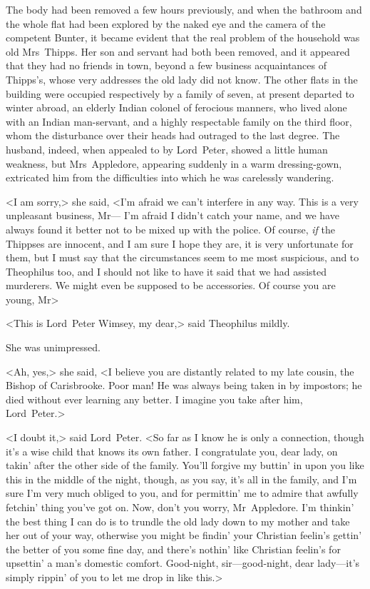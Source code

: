 The body had been removed a few hours previously, and when the bathroom and the whole flat had been explored by the naked eye and the camera of the competent Bunter, it became evident that the real problem of the household was old Mrs~Thipps. Her son and servant had both been removed, and it appeared that they had no friends in town, beyond a few business acquaintances of Thipps's, whose very addresses the old lady did not know. The other flats in the building were occupied respectively by a family of seven, at present departed to winter abroad, an elderly Indian colonel of ferocious manners, who lived alone with an Indian man-servant, and a highly respectable family on the third floor, whom the disturbance over their heads had outraged to the last degree. The husband, indeed, when appealed to by Lord~Peter, showed a little human weakness, but Mrs~Appledore, appearing suddenly in a warm dressing-gown, extricated him from the difficulties into which he was carelessly wandering.

<I am sorry,> she said, <I'm afraid we can't interfere in any way. This is a very unpleasant business, Mr— I'm afraid I didn't catch your name, and we have always found it better not to be mixed up with the police. Of course, \textit{if} the Thippses are innocent, and I am sure I hope they are, it is very unfortunate for them, but I must say that the circumstances seem to me most suspicious, and to Theophilus too, and I should not like to have it said that we had assisted murderers. We might even be supposed to be accessories. Of course you are young, Mr\longdash>

<This is Lord~Peter Wimsey, my dear,> said Theophilus mildly.

She was unimpressed.

<Ah, yes,> she said, <I believe you are distantly related to my late cousin, the Bishop of Carisbrooke. Poor man! He was always being taken in by impostors; he died without ever learning any better. I imagine you take after him, Lord~Peter.>

<I doubt it,> said Lord~Peter. <So far as I know he is only a connection, though it's a wise child that knows its own father. I congratulate you, dear lady, on takin' after the other side of the family. You'll forgive my buttin' in upon you like this in the middle of the night, though, as you say, it's all in the family, and I'm sure I'm very much obliged to you, and for permittin' me to admire that awfully fetchin' thing you've got on. Now, don't you worry, Mr~Appledore. I'm thinkin' the best thing I can do is to trundle the old lady down to my mother and take her out of your way, otherwise you might be findin' your Christian feelin's gettin' the better of you some fine day, and there's nothin' like Christian feelin's for upsettin' a man's domestic comfort. Good-night, sir—good-night, dear lady—it's simply rippin' of you to let me drop in like this.>

